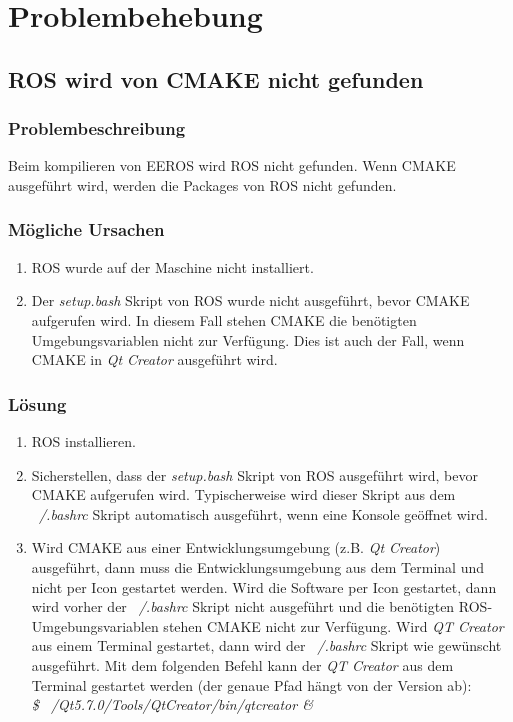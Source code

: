 \chapter{Problembehebung}


\section{ROS wird von CMAKE nicht gefunden}
\subsection{Problembeschreibung}
Beim kompilieren von EEROS wird ROS nicht gefunden.
Wenn CMAKE ausgeführt wird, werden die Packages von ROS nicht gefunden.

\subsection{Mögliche Ursachen}
\begin{enumerate}
\item ROS wurde auf der Maschine nicht installiert.
\item Der \textit{setup.bash} Skript von ROS wurde nicht ausgeführt, bevor CMAKE aufgerufen wird.
In diesem Fall stehen CMAKE die benötigten Umgebungsvariablen nicht zur Verfügung.
Dies ist auch der Fall, wenn CMAKE in \textit{Qt Creator} ausgeführt wird.
\end{enumerate}

\subsection{Lösung}
\begin{enumerate}
\item ROS installieren.
\item Sicherstellen, dass der \textit{setup.bash} Skript von ROS ausgeführt wird, bevor CMAKE aufgerufen wird.
Typischerweise wird dieser Skript aus dem \textit{~/.bashrc} Skript automatisch ausgeführt, wenn eine Konsole geöffnet wird.
\item Wird CMAKE aus einer Entwicklungsumgebung (z.B. \textit{Qt Creator}) ausgeführt, dann muss die Entwicklungsumgebung aus dem Terminal und nicht per Icon gestartet werden.
Wird die Software per Icon gestartet, dann wird vorher der \textit{~/.bashrc} Skript nicht ausgeführt und die benötigten ROS-Umgebungsvariablen stehen CMAKE nicht zur Verfügung.
Wird \textit{QT Creator} aus einem Terminal gestartet, dann wird der \textit{~/.bashrc} Skript wie gewünscht ausgeführt.
Mit dem folgenden Befehl kann der \textit{QT Creator} aus dem Terminal gestartet werden (der genaue Pfad hängt von der Version ab):\\
\textit{\$ ~/Qt5.7.0/Tools/QtCreator/bin/qtcreator \&}
\end{enumerate}


